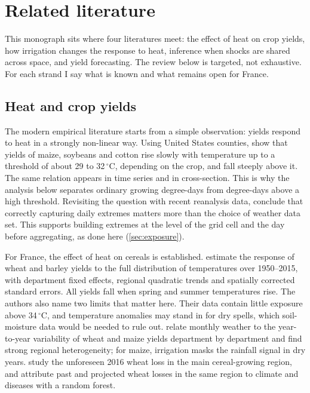 \section{Related literature}
\label{sec:literature}

This monograph sits where four literatures meet: the effect of heat on crop yields, how irrigation changes the response to heat, inference when shocks are shared across space, and yield forecasting. The review below is targeted, not exhaustive. For each strand I say what is known and what remains open for France.

\subsection{Heat and crop yields}

The modern empirical literature starts from a simple observation: yields respond to heat in a strongly non-linear way. Using United States counties, \textcite{schlenker2009} show that yields of maize, soybeans and cotton rise slowly with temperature up to a threshold of about 29 to 32\,$^{\circ}$C, depending on the crop, and fall steeply above it. The same relation appears in time series and in cross-section. This is why the analysis below separates ordinary growing degree-days from degree-days above a high threshold. Revisiting the question with recent reanalysis data, \textcite{hogan2024} conclude that correctly capturing daily extremes matters more than the choice of weather data set. This supports building extremes at the level of the grid cell and the day before aggregating, as done here (\cref{sec:exposure}).

For France, the effect of heat on cereals is established. \textcite{gammans2017} estimate the response of wheat and barley yields to the full distribution of temperatures over 1950--2015, with department fixed effects, regional quadratic trends and spatially corrected standard errors. All yields fall when spring and summer temperatures rise. The authors also name two limits that matter here. Their data contain little exposure above 34\,$^{\circ}$C, and temperature anomalies may stand in for dry spells, which soil-moisture data would be needed to rule out. \textcite{ceglar2016} relate monthly weather to the year-to-year variability of wheat and maize yields department by department and find strong regional heterogeneity; for maize, irrigation masks the rainfall signal in dry years. \textcite{benari2018} study the unforeseen 2016 wheat loss in the main cereal-growing region, and \textcite{noiajunior2025} attribute past and projected wheat losses in the same region to climate and diseases with a random forest.

